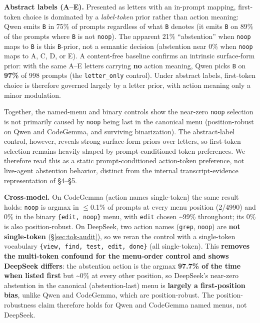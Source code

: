 \documentclass[
  11pt,
  a4paper]{article}
\begin{document}
\textbf{Abstract labels (A--E).} Presented as letters with an in-prompt
mapping, first-token choice is dominated by a \emph{label-token} prior
rather than action meaning: Qwen emits \texttt{B} in 75\% of prompts
regardless of what \texttt{B} denotes (it emits \texttt{B} on 89\% of
the prompts where \texttt{B} is not \texttt{noop}). The apparent 21\%
``abstention'' when \texttt{noop} maps to \texttt{B} is this
\texttt{B}-prior, not a semantic decision (abstention near 0\% when
\texttt{noop} maps to A, C, D, or E). A content-free baseline confirms
an intrinsic surface-form prior: with the same A--E letters carrying
\textbf{no} action meaning, Qwen picks \texttt{B} on \textbf{97\%} of
998 prompts (the \texttt{letter\_only} control). Under abstract labels,
first-token choice is therefore governed largely by a letter prior, with
action meaning only a minor modulation.

Together, the named-menu and binary controls show the near-zero
\texttt{noop} selection is not primarily caused by \texttt{noop} being
last in the canonical menu (position-robust on Qwen and CodeGemma, and
surviving binarization). The abstract-label control, however, reveals
strong surface-form priors over letters, so first-token selection
remains heavily shaped by prompt-conditioned token preferences. We
therefore read this as a static prompt-conditioned action-token
preference, not live-agent abstention behavior, distinct from the
internal transcript-evidence representation of \S{}4--\S{}5.

\textbf{Cross-model.} On CodeGemma (action names single-token) the same
result holds: \texttt{noop} is argmax in \ensuremath{\leq}0.1\% of prompts at every menu
position (2/4990) and 0\% in the binary \texttt{\{edit,\ noop\}} menu,
with \texttt{edit} chosen \textasciitilde99\% throughout; its 0\% is
also position-robust. On DeepSeek, two action names (\texttt{grep},
\texttt{noop}) are \textbf{not single-token} (\S{}\ref{sec:tok-audit}), so
we reran the control with a single-token vocabulary
\texttt{\{view,\ find,\ test,\ edit,\ done\}} (all single-token). This
\textbf{removes the multi-token confound for the menu-order control and
shows DeepSeek differs}: the abstention action is the argmax
\textbf{97.7\% of the time when listed first} but \textasciitilde0\% at
every other position, so DeepSeek's near-zero abstention in the
canonical (abstention-last) menu is \textbf{largely a first-position
bias}, unlike Qwen and CodeGemma, which are position-robust. The
position-robustness claim therefore holds for Qwen and CodeGemma named
menus, not DeepSeek.
\end{document}
